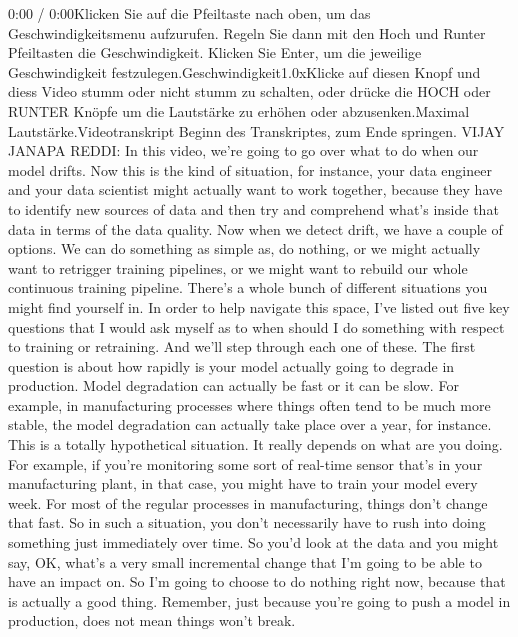 {{{{{{{{     0:00 / 0:00Klicken Sie auf die Pfeiltaste nach oben, um das Geschwindigkeitsmenu aufzurufen. Regeln Sie dann mit den Hoch und Runter Pfeiltasten die Geschwindigkeit. Klicken Sie Enter, um die jeweilige Geschwindigkeit festzulegen.Geschwindigkeit1.0xKlicke auf diesen Knopf und diess Video stumm oder nicht stumm zu schalten, oder drücke die HOCH oder RUNTER Knöpfe um die Lautstärke zu erhöhen oder abzusenken.Maximal Lautstärke.Videotranskript
     Beginn des Transkriptes, zum Ende springen.
     VIJAY JANAPA REDDI: In this video, we're going to go over
     what to do when our model drifts.
     Now this is the kind of situation, for instance, your data engineer
     and your data scientist might actually want to work together,
     because they have to identify new sources of data
     and then try and comprehend what's inside
     that data in terms of the data quality.
     Now when we detect drift, we have a couple of options.
     We can do something as simple as, do nothing,
     or we might actually want to retrigger training pipelines,
     or we might want to rebuild our whole continuous training pipeline.
     There's a whole bunch of different situations you might find yourself in.
     In order to help navigate this space, I've
     listed out five key questions that I would ask myself as to when should
     I do something with respect to training or retraining.
     And we'll step through each one of these.
     The first question is about how rapidly is your model actually going
     to degrade in production.
     Model degradation can actually be fast or it can be slow.
     For example, in manufacturing processes where things often
     tend to be much more stable, the model degradation
     can actually take place over a year, for instance.
     This is a totally hypothetical situation.
     It really depends on what are you doing.
     For example, if you're monitoring some sort of real-time sensor
     that's in your manufacturing plant, in that case,
     you might have to train your model every week.
     For most of the regular processes in manufacturing,
     things don't change that fast.
     So in such a situation, you don't necessarily
     have to rush into doing something just immediately over time.
     So you'd look at the data and you might say, OK,
     what's a very small incremental change that I'm
     going to be able to have an impact on.
     So I'm going to choose to do nothing right now, because that is actually
     a good thing.
     Remember, just because you're going to push a model in production,
     does not mean things won't break.
}}}}}}}}
